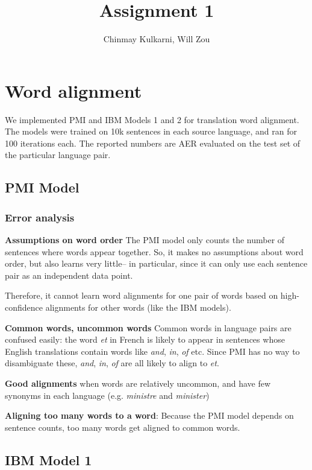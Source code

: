 \documentclass[letterpaper]{article}
\author{Chinmay Kulkarni, Will Zou}
\title{Assignment 1}
\begin{document}
\maketitle

\section{Word alignment}
We implemented PMI and IBM Models 1 and 2 for translation word alignment. The models were trained on 10k sentences in each source language, and ran for 100 iterations each. The reported numbers are AER evaluated on the test set of the particular language pair. 
\subsection{PMI Model}
\subsubsection{Error analysis} %
\label{ssub:error_analysis}

\textbf{Assumptions on word order} The PMI model only counts the number of sentences where words appear together. So, it makes no assumptions about word order, but also learns very little-- in particular, since it can only use each sentence pair as an independent data point. 

Therefore, it cannot learn word alignments for one pair of words based on high-confidence alignments for other words (like the IBM models).

\textbf{Common words, uncommon words} Common words in language pairs are confused easily: the word \textit{et} in French is likely to appear in sentences whose English translations contain words like \textit{and}, \textit{in}, \textit{of} etc. Since PMI has no way to disambiguate these,  \textit{and}, \textit{in}, \textit{of} are all likely to align to \textit{et}.

\textbf{Good alignments} when words are relatively uncommon, and have few synonyms in each language (e.g. \textit{ministre} and \textit{minister})

\textbf{Aligning too many words to a word}: Because the PMI model depends on sentence counts, too many words get aligned to common words.

\subsection{IBM Model 1} %
\label{sub:ibm_model_1}
\end{document}
